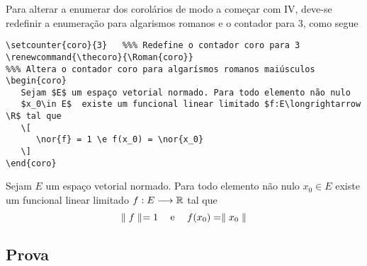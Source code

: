 Para alterar a enumerar dos corolários de modo a começar com IV, deve-se redefinir a enumeração para algarismos romanos e 
o contador para 3, como segue

\begin{tcolorbox}
\begin{lstlisting}
\setcounter{coro}{3}   %%% Redefine o contador coro para 3
\renewcommand{\thecoro}{\Roman{coro}}
%%% Altera o contador coro para algarísmos romanos maiúsculos
\begin{coro}
   Sejam $E$ um espaço vetorial normado. Para todo elemento não nulo
   $x_0\in E$  existe um funcional linear limitado $f:E\longrightarrow \R$ tal que
   \[
      \nor{f} = 1 \e f(x_0) = \nor{x_0}
   \]
\end{coro}
\end{lstlisting}
	\tcblower
\setcounter{coro}{3}   %
\renewcommand{\thecoro}{\Roman{coro}}%
\begin{coro}
   Sejam $E$ um espaço vetorial normado. Para todo elemento não nulo
   $x_0\in E$  existe um funcional linear limitado $f:E\longrightarrow \mathbb{R}$ tal que
   \[
      \parallel f\parallel_{} = 1 \hspace{1.25em}\hbox{e}\hspace{1.25em} f(x_0) = \parallel x_0\parallel_{}
   \]
\end{coro}
\end{tcolorbox}

\subsection{Prova}

